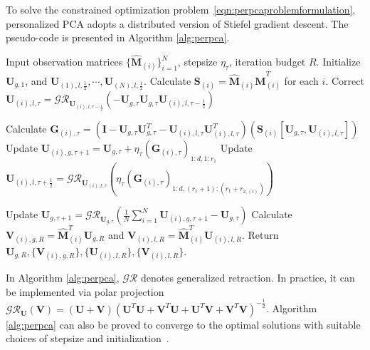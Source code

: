 \documentclass[twoside,11pt]{article}
\def\inneralg{\texttt{JIMF}\xspace}
\newcommand{\grof}[2]{\mathcal{GR}_{#1}\left(#2\right)}
\newcommand{\matG}{\mathbf{G}}
\newcommand{\matI}{\mathbf{I}}
\newcommand{\matS}{\mathbf{S}}
\newcommand{\matU}{\mathbf{U}}
\newcommand{\matV}{\mathbf{V}}
\newcommand{\hmatM}{\hat{\mathbf{M}}}
\newcommand{\fracud}{\frac{1}{2}}
\begin{document}
To solve the constrained optimization problem~\eqref{eqn:perpcaproblemformulation}, personalized PCA adopts a distributed version of Stiefel gradient descent. The pseudo-code is presented in Algorithm \ref{alg:perpca}.

\begin{algorithm}
\caption{\inneralg by personalized PCA}
\label{alg:perpca}
\begin{algorithmic}
\STATE Input observation matrices $\{\hmatM_{(i)}\}_{i=1}^N$, stepsize $\eta_\tau$, iteration budget $R$.
\STATE Initialize $\matU_{g,1}$, and $\matU_{(1),l,\frac{1}{2}},\cdots,\matU_{(N),l,\frac{1}{2}}$.
\STATE Calculate $\matS_{(i)}=\hmatM_{(i)}\hmatM_{(i)}^T$ for each $i$.
\STATE Correct $\matU_{(i),l,\tau}=\grof{\matU_{(i),l,\tau-\fracud}}{-\matU_{g,\tau}\matU_{g,\tau}\matU_{(i),l,\tau-\fracud} }$ 

\STATE Calculate $\matG_{(i),\tau}=\left(\matI-\matU_{g,\tau}\matU_{g,\tau}^T-\matU_{(i),l,\tau}\matU_{(i),l,\tau}^T\right)\left(\bm{S}_{(i)}\left[\matU_{g,\tau},\matU_{(i),l,\tau}\right]\right)$ 
\STATE Update $ \matU_{(i),g,\tau+1}=\matU_{g,\tau}+\eta_{\tau}(\matG_{(i),\tau})_{1:d,1:r_1}$ 
\STATE Update $ \matU_{(i),l,\tau+\frac{1}{2}}=\grof{\matU_{(i),l,\tau}}{ \eta_{\tau}(\matG_{(i),\tau})_{1:d,(r_1+1):(r_1+r_{2,(i)})}}$

\ENDFOR
\STATE Update $\matU_{g,\tau+1}=\grof{\matU_{g,\tau}}{\frac{1}{N}\sum_{i=1}^N\matU_{(i),g,\tau+1}-\matU_{g,\tau}}$ 
\ENDFOR
\STATE Calculate $\matV_{(i),g,R}=\hmatM_{(i)}^T\matU_{g,R}$ and $\matV_{(i),l,R}=\hmatM_{(i)}^T\matU_{(i),l,R}$.
\STATE Return $ \matU_{g,R}, \{\matV_{(i),g,R}\},\{\matU_{(i),l,R}\},\{\matV_{(i),l,R}\}$.
\end{algorithmic}
\end{algorithm}
In Algorithm \ref{alg:perpca}, $\mathcal{GR}$ denotes generalized retraction. In practice, it can be implemented via polar projection $\grof{\matU}{\matV}=\left(\matU+\matV\right)\left(\matU^T\matU+\matV^T\matU+\matU^T\matV+\matV^T\matV\right)^{-\fracud}$. Algorithm \ref{alg:perpca} can also be proved to converge to the optimal solutions with suitable choices of stepsize and initialization~\citep{personalizedpca}.
\end{document}
